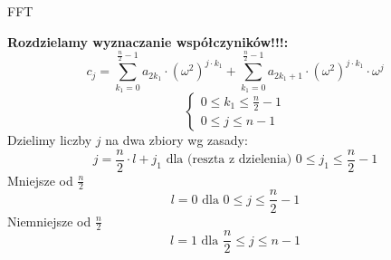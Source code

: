 \begin{frame}[allowframebreaks]{FFT}
\begin{block}{}
	\textbf{Rozdzielamy wyznaczanie współczyników!!!: }
	\[
		c_j = \sum\limits_{k_1=0}^{\frac{n}{2} - 1} a_{2 k_1} \cdot (\omega^2)^{j \cdot k_1} + \sum\limits_{k_1 = 0}^{\frac{n}{2} - 1} a_{2  k_1 + 1} \cdot (\omega^2)^{j \cdot k_1} \cdot \omega^j
		\tag{16.24}
	\]
	\blockbreak
	\[
	\begin{cases}
		0 \leq k_1 \leq \frac{n}{2} - 1 \\
		0 \leq j \leq n-1
	\end{cases}
	\]
Dzielimy liczby $j$ na dwa zbiory wg zasady:
		\[
		j = \frac{n}{2} \cdot l + j_1 \text{ dla (reszta z dzielenia) } 0 \leq j_1 \leq \frac{n}{2} - 1
	\]
	Mniejsze od $\frac{n}{2}$
	\[
         l=0 \text{ dla }   0 \leq j \leq \frac{n}{2} - 1 
	\]
	Niemniejsze od $\frac{n}{2}$
	\[
	l=1 \text{ dla }  \frac{n}{2}  \leq j \leq n-1 
	\]
	

\end{block}
\end{frame}
